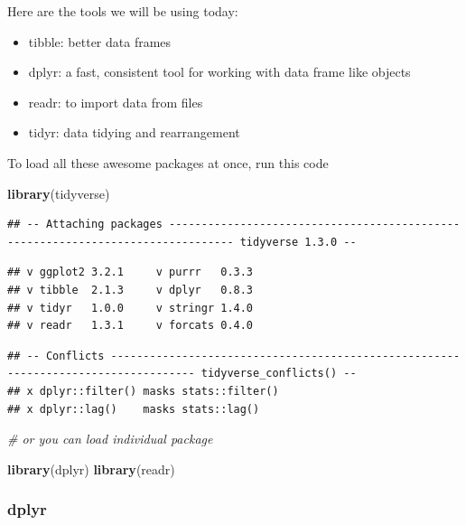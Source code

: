 \documentclass[
]{article}
\newenvironment{Shaded}{\begin{snugshade}}{\end{snugshade}}
\newcommand{\CommentTok}[1]{\textcolor[rgb]{0.56,0.35,0.01}{\textit{#1}}}
\newcommand{\KeywordTok}[1]{\textcolor[rgb]{0.13,0.29,0.53}{\textbf{#1}}}
\newcommand{\NormalTok}[1]{#1}
\providecommand{\tightlist}{%
  \setlength{\itemsep}{0pt}\setlength{\parskip}{0pt}}
\begin{document}
Here are the tools we will be using today:

\begin{itemize}
\tightlist
\item
  tibble: better data frames
\item
  dplyr: a fast, consistent tool for working with data frame like
  objects
\item
  readr: to import data from files
\item
  tidyr: data tidying and rearrangement
\end{itemize}

To load all these awesome packages at once, run this code

\begin{Shaded}
\begin{Highlighting}[]
\KeywordTok{library}\NormalTok{(tidyverse)}
\end{Highlighting}
\end{Shaded}

\begin{verbatim}
## -- Attaching packages -------------------------------------------------------------------------------- tidyverse 1.3.0 --
\end{verbatim}

\begin{verbatim}
## v ggplot2 3.2.1     v purrr   0.3.3
## v tibble  2.1.3     v dplyr   0.8.3
## v tidyr   1.0.0     v stringr 1.4.0
## v readr   1.3.1     v forcats 0.4.0
\end{verbatim}

\begin{verbatim}
## -- Conflicts ----------------------------------------------------------------------------------- tidyverse_conflicts() --
## x dplyr::filter() masks stats::filter()
## x dplyr::lag()    masks stats::lag()
\end{verbatim}

\begin{Shaded}
\begin{Highlighting}[]
\CommentTok{# or you can load individual package}

\KeywordTok{library}\NormalTok{(dplyr)}
\KeywordTok{library}\NormalTok{(readr)}
\end{Highlighting}
\end{Shaded}

\hypertarget{dplyr}{%
\subsubsection{dplyr}\label{dplyr}}
\end{document}
